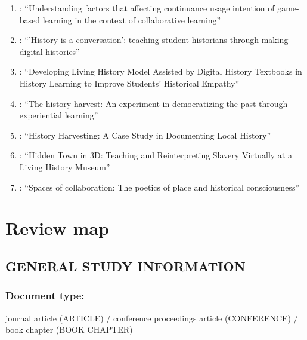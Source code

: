 \documentclass[
hf,
]{ceurart}
\begin{document}
\begin{enumerate}
    \item \citet{Shiue20176445}: ``Understanding factors that affecting continuance usage intention of game-based learning in the context of collaborative learning''
    
    \item \citet{Bell2016}: ``'History is a conversation': teaching student historians through making digital histories''
    
    \item \citet{Darmawan2025}: ``Developing Living History Model Assisted by Digital History Textbooks in History Learning to Improve Students' Historical Empathy''
    
    \item \citet{Thomas2008}: ``The history harvest: An experiment in democratizing the past through experiential learning''
    
    \item \citet{Woodring2023}: ``History Harvesting: A Case Study in Documenting Local History''
    
    \item \citet{Lewis2021}: ``Hidden Town in 3D: Teaching and Reinterpreting Slavery Virtually at a Living History Museum''
    
    \item \citet{McLean20144}: ``Spaces of collaboration: The poetics of place and historical consciousness''
\end{enumerate}

\section{Review map} \label{sec:appendix-c}


\subsection*{GENERAL STUDY INFORMATION}

\subsubsection*{Document type:}
journal article (ARTICLE) / conference proceedings article (CONFERENCE) / book chapter (BOOK CHAPTER)
\end{document}
